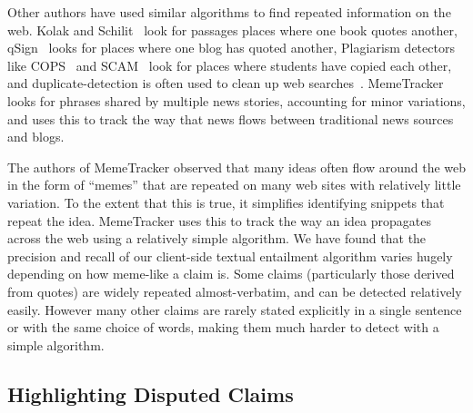 \documentclass{www2010-submission}
\newcommand{\todo}[1]{}
\begin{document}
\todo{Should we have a version where the interface merely suggests n-grams that should be used by the classifier}
\todo{Can we present all these systems without giving detailed stats about how they compare?}
\todo{Add support for a user to enter 'anti-phrases' when a snippet is wrongly highlighted}
\todo{Add support for a user to enter a paraphrase that will match the snippet they are looking at}
\todo{Do a load more people in a final user-study round. Try to get it up to 8.}
\todo{Explain how our algorithm relates to existing NLP work - due to unusual domain}


Other authors have used similar algorithms to find repeated information on the web. Kolak and Schilit~\cite{Kolak2008} look for passages places where one book quotes another, qSign~\cite{Kim2009} looks for places where one blog has quoted another, Plagiarism detectors like COPS~\cite{COPS} and SCAM~\cite{SCAM} look for places where students have copied each other, and duplicate-detection is often used to clean up web searches~\cite{web-copy-detect}. MemeTracker~\cite{Backstrom2009} looks for phrases shared by multiple news stories, accounting for minor variations, and uses this to track the way that news flows between traditional news sources and blogs.

The authors of MemeTracker observed that many ideas often flow around the web in the form of ``memes'' that are repeated on many web sites with relatively little variation. To the extent that this is true, it simplifies identifying snippets that repeat the idea. MemeTracker uses this to track the way an idea propagates across the web using a relatively simple algorithm. We have found that the precision and recall of our client-side textual entailment algorithm varies hugely depending on how meme-like a claim is. Some claims (particularly those derived from quotes) are widely repeated almost-verbatim, and can be detected relatively easily. However many other claims are rarely stated explicitly in a single sentence or with the same choice of words, making them much harder to detect with a simple algorithm.

\todo{Give an example of a good meme}

\todo{Talk about what dispute finder does, and how it differs - maybe by moving this into the main system section}
\todo{Cite plagarism detection}
\todo{Talk about how our algorithm looks for key terms used in disputed claims}
\todo{Talk about how our first pass NLP algo is rather like }


\subsection{Highlighting Disputed Claims}
\end{document}
